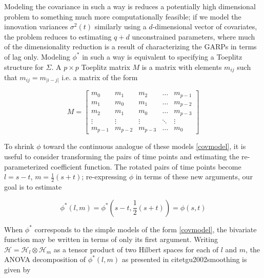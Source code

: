 \documentclass[12pt]{article}
\theoremstyle{definition}
\begin{document}

Modeling the covariance in such a way is reduces a potentially high dimensional problem to something much more computationally feasible; if we model the innovation variances $\sigma^2\left(t\right)$ similarly using a $d$-dimensional vector of covariates, the problem reduces to estimating $q+d$ unconstrained parameters, where much of the dimensionality reduction is a result of characterizing the GARPs in terms of lag only. Modeling $\phi^*$ in such a way is equivalent to specifying a Toeplitz structure for $\Sigma$. A $p \times p$ Toeplitz matrix $M$ is a matrix with elements $m_{ij}$ such that $m_{ij} = m_{\vert i-j \vert}$ i.e. a matrix of the form

\begin{equation}
M = \begin{bmatrix} m_0 & m_1 & m_2 & \dots & m_{p-1}\\ m_1 & m_0 & m_1 & \dots & m_{p-2}\\m_2 & m_1 & m_0 & \dots & m_{p-3}\\ \vdots & \vdots & \vdots & \ddots & \vdots\\  m_{p-1} & m_{p-2} & m_{p-3} & \dots & m_0 \end{bmatrix} \label{toeplitz}
\end{equation}

To shrink $\phi$ toward the continuous analogue of these models \eqref{covmodel}, it is useful to consider transforming the pairs of time points and estimating the re-parameterized coefficient function. The rotated pairs of time points become $l = s-t$, $m = \frac{1}{2}\left(s+t\right)$; re-expressing $\phi$ in terms of these new arguments, our goal is to estimate

\begin{equation}
\phi^*\left(l,m\right) = \phi^*\left(s-t, \frac{1}{2}\left(s+t\right)\right) = \phi\left(s,t\right)
\end{equation}

When $\phi^*$ corresponds to the simple models of the form \eqref{covmodel}, the bivariate function may be written in terms of only its first argument. Writing $\mathcal{H} = \mathcal{H}_l \otimes \mathcal{H}_m$ as a tensor product of two Hilbert spaces for each of $l$ and $m$, the ANOVA decomposition of $\phi^*\left(l,m\right) $ as presented in citet{gu2002smoothing} is given by 
\end{document}
